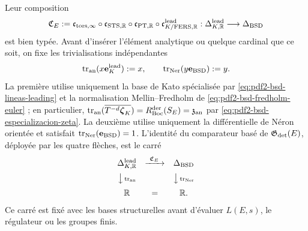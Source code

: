 Leur composition
\begin{equation}\label{eq:pdf2-bsd-comparador-total}
 \mathfrak C_E:=
 \mathfrak c_{\rm tors,\infty}\circ
 \mathfrak c_{{\rm STS},\mathbb R}\circ
 \mathfrak c_{{\rm PT},\mathbb R}\circ
 \mathfrak c_{K/{\rm FERS},\mathbb R}^{\rm lead}:
 \Delta_{K,\mathbb R}^{\rm lead}
 \longrightarrow\Delta_{\rm BSD}
\end{equation}
est bien typée. Avant d'insérer l'élément analytique ou quelque cardinal que ce soit,
on fixe les trivialisations indépendantes
\begin{equation}\label{eq:pdf2-bsd-trivializaciones-independientes}
 \operatorname{tr}_{\rm an}(x\mathbf e_K^{\rm lead}):=x,
 \qquad
 \operatorname{tr}_{\rm Ner}(y\mathbf e_{\rm BSD}):=y.
\end{equation}
La première utilise uniquement la base de Kato spécialisée par
\eqref{eq:pdf2-bsd-lineas-leading} et la normalisation Mellin--Fredholm de
\eqref{eq:pdf2-bsd-fredholm-euler} ; en particulier,
$\operatorname{tr}_{\rm an}
(\overline{T^{-d}\boldsymbol\zeta_K})
=R_{\rm Boc}^{\rm der}(S_E)=\mathfrak z_{\rm an}$ par
\eqref{eq:pdf2-bsd-especializacion-zeta}. La deuxième utilise uniquement la différentielle
de Néron orientée et satisfait
$\operatorname{tr}_{\rm Ner}(\mathbf e_{\rm BSD})=1$. L'identité du
comparateur basé de $\mathfrak G_{\rm det}(E)$, déployée par les quatre
flèches, est le
carré
\begin{equation}\label{eq:pdf2-bsd-cuadrado-trivializaciones}
\begin{array}{ccc}
 \Delta_{K,\mathbb R}^{\rm lead}
   &\xrightarrow{\ \mathfrak C_E\ }&\Delta_{\rm BSD}\\[2mm]
 \big\downarrow\scriptstyle\operatorname{tr}_{\rm an}
   &&\big\downarrow\scriptstyle\operatorname{tr}_{\rm Ner}\\[2mm]
 \mathbb R&=&\mathbb R.
\end{array}
\end{equation}
Ce carré est fixé avec les bases structurelles avant d'évaluer
$L(E,s)$, le régulateur ou les groupes finis.

